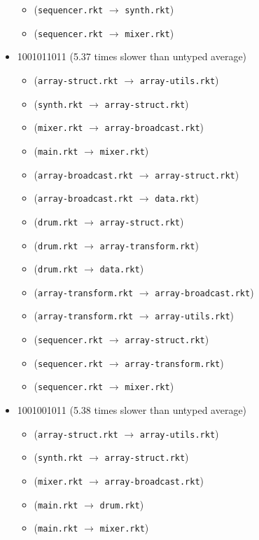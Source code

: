 \documentclass{article}
\newcommand{\mono}[1]{\texttt{#1}}
\begin{document}
\begin{itemize}
\begin{itemize}
  \item (\mono{sequencer.rkt} $\rightarrow$ \mono{synth.rkt})
  \item (\mono{sequencer.rkt} $\rightarrow$ \mono{mixer.rkt})
  \end{itemize}
\item 1001011011 (5.37 times slower than untyped average)
  \begin{itemize}
  \item (\mono{array-struct.rkt} $\rightarrow$ \mono{array-utils.rkt})
  \item (\mono{synth.rkt} $\rightarrow$ \mono{array-struct.rkt})
  \item (\mono{mixer.rkt} $\rightarrow$ \mono{array-broadcast.rkt})
  \item (\mono{main.rkt} $\rightarrow$ \mono{mixer.rkt})
  \item (\mono{array-broadcast.rkt} $\rightarrow$ \mono{array-struct.rkt})
  \item (\mono{array-broadcast.rkt} $\rightarrow$ \mono{data.rkt})
  \item (\mono{drum.rkt} $\rightarrow$ \mono{array-struct.rkt})
  \item (\mono{drum.rkt} $\rightarrow$ \mono{array-transform.rkt})
  \item (\mono{drum.rkt} $\rightarrow$ \mono{data.rkt})
  \item (\mono{array-transform.rkt} $\rightarrow$ \mono{array-broadcast.rkt})
  \item (\mono{array-transform.rkt} $\rightarrow$ \mono{array-utils.rkt})
  \item (\mono{sequencer.rkt} $\rightarrow$ \mono{array-struct.rkt})
  \item (\mono{sequencer.rkt} $\rightarrow$ \mono{array-transform.rkt})
  \item (\mono{sequencer.rkt} $\rightarrow$ \mono{mixer.rkt})
  \end{itemize}
\item 1001001011 (5.38 times slower than untyped average)
  \begin{itemize}
  \item (\mono{array-struct.rkt} $\rightarrow$ \mono{array-utils.rkt})
  \item (\mono{synth.rkt} $\rightarrow$ \mono{array-struct.rkt})
  \item (\mono{mixer.rkt} $\rightarrow$ \mono{array-broadcast.rkt})
  \item (\mono{main.rkt} $\rightarrow$ \mono{drum.rkt})
  \item (\mono{main.rkt} $\rightarrow$ \mono{mixer.rkt})

\end{itemize}
\end{itemize}
\end{document}
